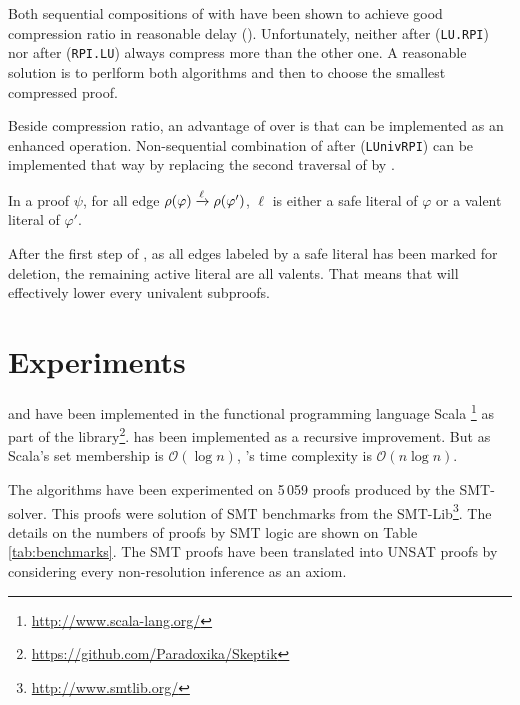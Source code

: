 \documentclass{llncs}
\begin{document}
Both sequential compositions of {\LowerUnits} with {\RPI} have been shown to achieve good
compression ratio in reasonable delay (\cite{LURPI}). Unfortunately, neither {\LowerUnits} after
{\RPI} (\texttt{LU.RPI}) nor {\RPI} after {\LowerUnits} (\texttt{RPI.LU}) always compress more than
the other one. A reasonable solution is to perlform both algorithms and then to choose the smallest
compressed proof.

Beside compression ratio, an advantage of {\LowerUnivalents} over {\LowerUnits} is that
{\LowerUnivalents} can be implemented as an enhanced  operation.  Non-sequential
combination of {\LowerUnivalents} after {\RPI} (\texttt{LUnivRPI}) can be implemented that way by
replacing the second traversal of {\RPI} by {\LowerUnivalents}.

\begin{proposition} \label{prop:LunivRPI}
In a proof $\psi$, for all edge $\rho(\varphi) \xrightarrow{\ell} \rho(\varphi')$, $\ell$ is
either a safe literal of $\varphi$ or a valent literal of $\varphi'$.
\end{proposition}

After the first step of {\RPI}, as all edges labeled by a safe literal has been marked for deletion,
the remaining active literal are all valents. That means that {\LowerUnivalents} will effectively
lower every univalent subproofs.



\section{Experiments} \label{sec:exp}

{\LowerUnivalents} and {\LUnivRPI} have been implemented in the functional programming
language Scala \footnote{\url{http://www.scala-lang.org/}} as part of the \skeptik
library\footnote{\url{https://github.com/Paradoxika/Skeptik}}. {\LowerUnivalents} has been implemented as a
recursive  improvement. But as Scala's set membership is $\mathcal{O}(\log{n})$,
{\LowerUnivalents}'s time complexity is $\mathcal{O}(n \log{n})$.

The algorithms have been experimented on 5\,059 proofs produced by the {\veriT} SMT-solver. This
proofs were solution of SMT benchmarks from the SMT-Lib\footnote{\url{http://www.smtlib.org/}}.
The details on the numbers of proofs by SMT logic are shown on Table \ref{tab:benchmarks}.  The SMT
proofs have been translated into UNSAT proofs by considering every non-resolution inference as an
axiom.
\end{document}
